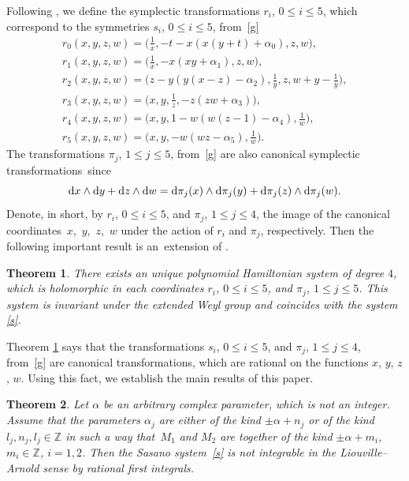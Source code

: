 \documentclass[10pt,a4paper]{amsart}
\numberwithin{equation}{section}
\newtheorem{Theorem}{Theorem}[section]
\begin{document}
 Following \cite{SY}, we define the symplectic transformations $r_i$, $0 \leq i \leq 5$, which correspond to the symmetries
 $s_i$, $0 \leq i \leq 5$, from~\eqref{g}
 \begin{gather*}
 r_0(x, y, z, w) =
 \biggl(\frac{1}{x}, -t - x (x (y+t) + \alpha_0), z, w\biggr),\\
 r_1(x, y, z, w) =
 \biggl(\frac{1}{x}, -x (x y + \alpha_1), z, w\biggr),\\
 r_2(x, y, z, w) =
 \biggl(z- y (y (x-z) -\alpha_2), \frac{1}{y}, z, w+y - \frac{1}{y}\biggr),\\
 r_3(x, y, z, w) =
 \biggl(x, y, \frac{1}{z}, -z (z w + \alpha_3)\biggr),\\
 r_4(x, y, z, w) =
 \biggl(x, y, 1-w (w (z-1) - \alpha_4), \frac{1}{w}\biggr),\\
 r_5(x, y, z, w) =
 \biggl(x, y, -w (w z - \alpha_5), \frac{1}{w}\biggr) .
 \end{gather*}
 The transformations $\pi_j$, $1 \leq j \leq 5$, from~\eqref{g} are also canonical symplectic transformations~since
 \[
 {\rm d}x \wedge {\rm d} y + {\rm d} z \wedge {\rm d} w={\rm d} \pi_j(x) \wedge {\rm d} \pi_j(y) + {\rm d} \pi_j (z) \wedge {\rm d} \pi_j(w) .
 \]
 Denote, in short, by $r_i$, $0 \leq i \leq 5$, and $\pi_j$, $1 \leq j \leq 4$, the image of the
 canonical coordinates~$x$,~$y$,~$z$,~$w$ under the action of $r_i$ and $\pi_j$, respectively.
 Then the following important result is an~extension of \cite[Theorem 4.1]{SY}.

 \begin{Theorem}\label{bct}
 There exists an unique polynomial Hamiltonian system of degree $4$, which is holomorphic in each coordinates
 $r_i$, $0 \leq i \leq 5$, and $\pi_j$, $1 \leq j \leq 5$. This system is invariant under the extended Weyl group
 and coincides with the system
 \eqref{s}.
 \end{Theorem}

 Theorem \ref{bct} says that the transformations $s_i$, $0 \leq i \leq 5$, and $\pi_j$, $1 \leq j \leq 4$, from~\eqref{g} are
 canonical transformations, which are rational on the functions $x$, $y$, $z$, $w$. Using this fact, we establish the main results of this
 paper.

 \begin{Theorem}\label{1}
 Let $\alpha$ be an arbitrary complex parameter, which is not an integer. Assume that the parameters $\alpha_j$ are either of the kind
 $\pm \alpha + n_j$ or of the kind $l_j, n_j, l_j\in\mathbb{Z}$ in such a way that~$M_1$ and
 $M_2$ are together of the kind $\pm \alpha + m_i$, $m_i\in\mathbb{Z}$, $i=1, 2$. Then the Sasano system~\eqref{s} is not integrable in the Liouville--Arnold sense by rational first integrals.
 \end{Theorem}
\end{document}

